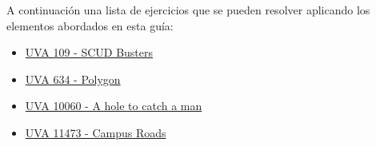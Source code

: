 A continuación una lista de ejercicios que se pueden resolver aplicando los elementos abordados en esta guía:

\begin{itemize}
	\item \href{https://onlinejudge.org/index.php?option=com_onlinejudge&Itemid=8&category=3&page=show_problem&problem=45}{UVA 109 - SCUD Busters} 
	\item \href{https://onlinejudge.org/index.php?option=com_onlinejudge&Itemid=8&category=8&page=show_problem&problem=575}{UVA 634 - Polygon}
	\item \href{https://onlinejudge.org/index.php?option=com_onlinejudge&Itemid=8&category=12&page=show_problem&problem=1001}{UVA 10060 - A hole to catch a man} 
	\item \href{https://onlinejudge.org/index.php?option=com_onlinejudge&Itemid=8&category=26&page=show_problem&problem=2468}{UVA 11473 - Campus Roads}
\end{itemize}